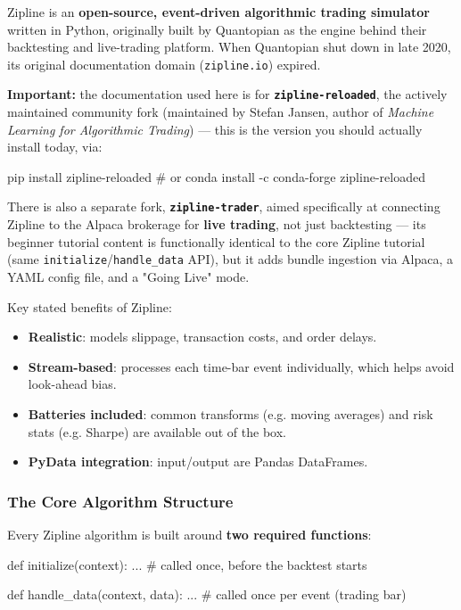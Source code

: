\documentclass[12pt,openany]{book}
\theoremstyle{definition}
\theoremstyle{remark}
\begin{document}
Zipline is an \textbf{open-source, event-driven algorithmic trading simulator} written in Python, originally built by Quantopian as the engine behind their backtesting and live-trading platform. When Quantopian shut down in late 2020, its original documentation domain (\texttt{zipline.io}) expired.

\textbf{Important:} the documentation used here is for \textbf{\texttt{zipline-reloaded}}, the actively maintained community fork (maintained by Stefan Jansen, author of \emph{Machine Learning for Algorithmic Trading}) — this is the version you should actually install today, via:

\begin{python}
pip install zipline-reloaded
# or
conda install -c conda-forge zipline-reloaded
\end{python}

There is also a separate fork, \textbf{\texttt{zipline-trader}}, aimed specifically at connecting Zipline to the Alpaca brokerage for \textbf{live trading}, not just backtesting — its beginner tutorial content is functionally identical to the core Zipline tutorial (same \texttt{initialize}/\texttt{handle\_data} API), but it adds bundle ingestion via Alpaca, a YAML config file, and a "Going Live" mode.

Key stated benefits of Zipline:

\begin{itemize}
\item \textbf{Realistic}: models slippage, transaction costs, and order delays.

\item \textbf{Stream-based}: processes each time-bar event individually, which helps avoid look-ahead bias.

\item \textbf{Batteries included}: common transforms (e.g. moving averages) and risk stats (e.g. Sharpe) are available out of the box.

\item \textbf{PyData integration}: input/output are Pandas DataFrames.

\end{itemize}
\subsubsection{The Core Algorithm Structure}

Every Zipline algorithm is built around \textbf{two required functions}:

\begin{python}
def initialize(context):
    ...  # called once, before the backtest starts

def handle_data(context, data):
    ...  # called once per event (trading bar)
\end{python}
\end{document}
